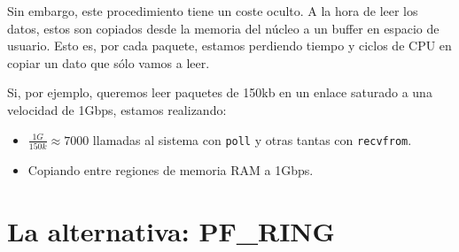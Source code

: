 Sin embargo, este procedimiento tiene un coste oculto. A la hora de leer los datos, estos son copiados desde la 
memoria del núcleo a un buffer en espacio de usuario. Esto es, por cada paquete, estamos perdiendo tiempo y ciclos de 
CPU en copiar un dato que sólo vamos a leer.

Si, por ejemplo, queremos leer paquetes de 150kb en un enlace saturado a una velocidad de 1Gbps, estamos realizando:
\begin{itemize}
 \item $\frac{1G}{150k} \approx 7000$ llamadas al sistema con \texttt{poll} y otras tantas con \texttt{recvfrom}.
 \item Copiando entre regiones de memoria RAM a 1Gbps.
\end{itemize}

\section{La alternativa: PF\_RING}


\endinput

\begin{Resumen}[Resumen de PF RING]


\subsection*{S1}

\end{Resumen}


